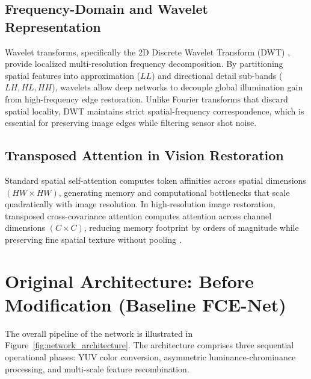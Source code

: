\documentclass[10pt,twocolumn,letterpaper]{article}
\begin{document}
\subsection{Frequency-Domain and Wavelet Representation}
Wavelet transforms, specifically the 2D Discrete Wavelet Transform (DWT) \cite{mallat1989theory}, provide localized multi-resolution frequency decomposition. By partitioning spatial features into approximation ($LL$) and directional detail sub-bands ($LH, HL, HH$), wavelets allow deep networks to decouple global illumination gain from high-frequency edge restoration. Unlike Fourier transforms that discard spatial locality, DWT maintains strict spatial-frequency correspondence, which is essential for preserving image edges while filtering sensor shot noise.

\subsection{Transposed Attention in Vision Restoration}
Standard spatial self-attention \cite{vaswani2017attention} computes token affinities across spatial dimensions $(HW \times HW)$, generating memory and computational bottlenecks that scale quadratically with image resolution. In high-resolution image restoration, transposed cross-covariance attention computes attention across channel dimensions $(C \times C)$, reducing memory footprint by orders of magnitude while preserving fine spatial texture without pooling \cite{zamir2022restormer}.

\section{Original Architecture: Before Modification (Baseline FCE-Net)}
The overall pipeline of the network is illustrated in Figure~\ref{fig:network_architecture}. The architecture comprises three sequential operational phases: YUV color conversion, asymmetric luminance-chrominance processing, and multi-scale feature recombination.
\end{document}
